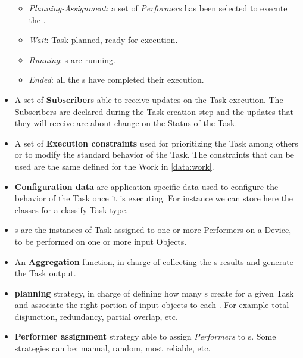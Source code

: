 \begin{itemize}
\begin{itemize}
            \item \emph{Planning-Assignment}: a set of \emph{Performers} has
            been selected to execute the \utask{}.
            
            \item \emph{Wait}: Task planned, \utask{} ready for execution.
            
            \item \emph{Running}: \utask{}s are running.
            
            \item \emph{Ended}: all the \utask{}s have completed their execution.
        \end{itemize}
    
    \item A set of \textbf{Subscriber}s able to receive updates on the Task
    execution. The Subscribers are declared during the Task creation step and the
    updates that they will receive are about change on the Status of the Task.

    \item A set of \textbf{Execution constraints} used for prioritizing the Task
    among others or to modify the standard behavior of the Task. The constraints
    that can be used are the same defined for the Work in \ref{data:work}.

    \item \textbf{Configuration data} are application specific data used to
    configure the behavior of the Task once it is executing. For instance
    we can store here the classes for a classify Task type.

    \item \textbf{\utask{}}s are the instances of Task assigned to one or more
    Performers on a Device, to be performed on one or more input Objects.

    \item An \textbf{Aggregation} function, in charge of collecting the \utask{}s
    results and generate the Task output.
    
    \item \textbf{\utask{} planning} strategy, in charge of defining how many
    \utask{}s create for a given Task and associate the right portion of input
    objects to each \utask{}. For example total disjunction, redundancy, partial
    overlap, etc.
    
    \item \textbf{Performer assignment} strategy able to assign \emph{Performers}
    to \utask{}s. Some strategies can be: manual, random, most reliable, etc.


\end{itemize}
